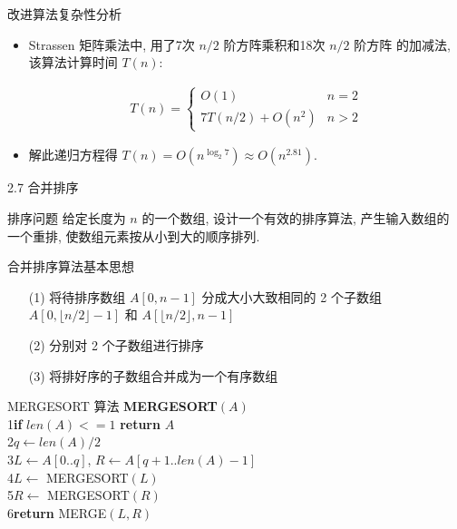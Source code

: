 \documentclass[fontset=fandol,UTF8,fleqn]{beamer}
\begin{document}
\begin{frame}{改进算法复杂性分析}
\begin{itemize}[<+-|alert@+>]
\item Strassen 矩阵乘法中, 用了7次 $n/2$ 阶方阵乘积和18次 $n/2$ 阶方阵
  的加减法, 该算法计算时间 $T(n)$:  
  \begin{exampleblock}{}
\begin{eqnarray*}
  T(n)= \left\{
    \begin{array}{ll}
       O(1) & n=2   \\
      7T(n/2)+O(n^2) & n>2        
    \end{array}\right. 
\end{eqnarray*}
\end{exampleblock}
\item 解此递归方程得 $T(n)=O(n^{\log_2 7})\approx O(n^{2. 81})$.  
\end{itemize}
\end{frame}

\begin{frame}{2.7 合并排序}
  \begin{exampleblock}{排序问题}
    给定长度为 $n$ 的一个数组, 设计一个有效的排序算法, 产生输入数组的
    一个重排, 使数组元素按从小到大的顺序排列.
  \end{exampleblock}
\end{frame}

\begin{frame}{合并排序算法基本思想}
\begin{itemize}[<+-|alert@+>]
\item[(1)]  将待排序数组 $A[0,n-1]$ 分成大小大致相同的 2 个子数组 $A[0,\lfloor n/2\rfloor-1]$ 和 $A[\lfloor n/2\rfloor,n-1]$   
\item [(2)] 分别对 2 个子数组进行排序   
\item [(3)] 将排好序的子数组合并成为一个有序数组   
\end{itemize}
\end{frame}

\begin{frame}{\textsf{MERGESORT} 算法}
\textbf{\textsc{MERGESORT}}$(A)$\\
1\quad \textbf{if} $len(A) <=1 $ \textbf{return} $A$ \\
2\quad  $q\gets len(A)/2$\\
3\quad  $L\gets A[0..q]$, $R\gets A[q+1..len(A)-1]$ \\
4\quad  $L \gets$ \textsf{MERGESORT}$(L)$\\
5\quad  $R \gets$ \textsf{MERGESORT}$(R)$\\
6\quad  \textbf{return} \textsf{MERGE}$(L, R)$\\
\end{frame}
\end{document}
